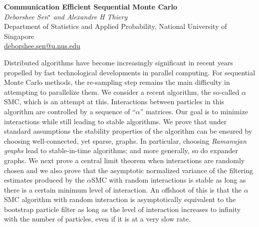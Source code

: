 \documentclass[12pt]{article}
\newcommand{\postertitle}[1]{{\Large\bf #1}\\[12pt]}
\newcommand{\authors}[1]{\emph{#1}\\}
\newcommand{\affiliations}[1]{{#1}\\}
\newcommand{\contacts}[1]{{#1}}
\begin{document}
\begin{center}
\vspace*{0.5cm}
%
\postertitle{Communication Efficient Sequential Monte Carlo}
%
\authors{Deborshee Sen$^\star$ and Alexandre H Thiery} %
% 
\affiliations{Department of Statistics and Applied Probability, National University of Singapore}
%
\contacts{\url{deborshee.sen@u.nus.edu}} %
%
\vspace*{0.3cm}
\end{center}


Distributed algorithms have become increasingly significant in recent years propelled by fast technological developments in parallel computing. 
For sequential Monte Carlo methods, the re-sampling step remains the main difficulty in attempting to parallelize them. We consider a recent algorithm, the so-called $\alpha$SMC, which is an attempt at this. Interactions between particles in this algorithm are controlled by a sequence of ``$\alpha$'' matrices. Our goal is to minimize interactions while still leading to stable algorithms.
We prove that under standard assumptions the stability properties of the algorithm can be ensured by choosing well-connected, yet sparse, graphs. In particular, choosing \emph{Ramanujan graphs} lead to stable-in-time algorithms; and more generally, so do expander graphs. 
We next prove a central limit theorem when interactions are randomly chosen and we also prove that the asymptotic normalized variance of the filtering estimates produced by the $\alpha$SMC with random interactions is stable as long as there is a certain minimum level of interaction. 
An offshoot of this is that the $\alpha$SMC algorithm with random interaction is asymptotically equivalent to the bootstrap particle filter as long as the level of interaction increases to infinity with the number of particles, even if it is at a very slow rate.






\end{document}
